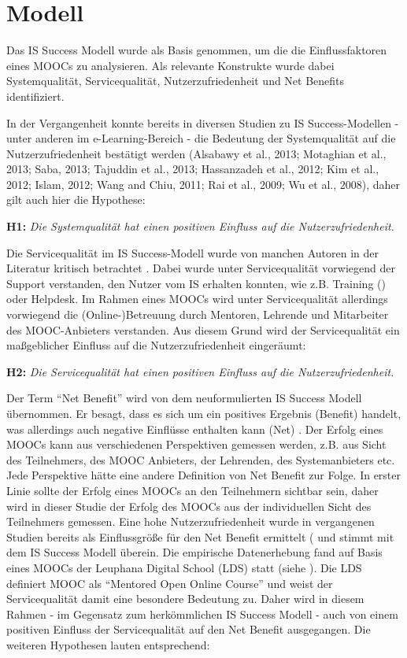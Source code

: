 \section{Modell}
\label{sec:modell}
Das IS Success Modell wurde als Basis genommen, um die die Einflussfaktoren eines MOOCs zu analysieren. Als relevante Konstrukte wurde dabei Systemqualität, Servicequalität, Nutzerzufriedenheit und Net Benefits identifiziert.  

In der Vergangenheit konnte bereits in diversen Studien zu IS Success-Modellen - unter anderen im e-Learning-Bereich - die Bedeutung der Systemqualität auf die Nutzerzufriedenheit bestätigt werden (Alsabawy et al., 2013; Motaghian et al., 2013; Saba, 2013; Tajuddin et al., 2013; Hassanzadeh et al., 2012; Kim et al., 2012; Islam, 2012; Wang and Chiu, 2011; Rai et al., 2009; Wu et al., 2008), daher gilt auch hier die Hypothese: \medskip

\textbf{H1:} \textit{Die Systemqualität hat einen positiven Einfluss auf die Nutzerzufriedenheit.} \medskip

Die Servicequalität im IS Success-Modell wurde von manchen Autoren in der Literatur kritisch betrachtet . Dabei wurde unter Servicequalität vorwiegend der Support verstanden, den Nutzer vom IS erhalten konnten, wie z.B. Training (\parencite{petter2009meta}) oder Helpdesk. Im Rahmen eines MOOCs wird unter Servicequalität allerdings vorwiegend die (Online-)Betreuung durch Mentoren, Lehrende und Mitarbeiter des MOOC-Anbieters verstanden. Aus diesem Grund wird der Servicequalität ein maßgeblicher Einfluss auf die Nutzerzufriedenheit eingeräumt: \medskip

\textbf{H2:} \textit{Die Servicequalität hat einen positiven Einfluss auf die Nutzerzufriedenheit.}\medskip

Der Term "`Net Benefit"' wird von dem neuformulierten IS Success Modell übernommen. Er besagt, dass es sich um ein positives Ergebnis (Benefit) handelt, was allerdings auch negative Einflüsse enthalten kann (Net) \parencite[vgl.][S.2974]{delone2002information}. Der Erfolg eines MOOCs kann aus verschiedenen Perspektiven gemessen werden, z.B. aus Sicht des Teilnehmers, des MOOC Anbieters, der Lehrenden, des Systemanbieters etc. Jede Perspektive hätte eine andere Definition von Net Benefit zur Folge. In erster Linie sollte der Erfolg eines MOOCs an den Teilnehmern sichtbar sein, daher wird in dieser Studie der Erfolg des MOOCs aus der individuellen Sicht des Teilnehmers gemessen. Eine hohe Nutzerzufriedenheit wurde in vergangenen Studien bereits als Einflussgröße für den Net Benefit ermittelt ( und stimmt mit dem IS Success Modell überein. Die empirische Datenerhebung fand auf Basis eines MOOCs der Leuphana Digital School (LDS) statt (siehe ). Die LDS definiert MOOC als "`Mentored Open Online Course"' und weist der Servicequalität damit eine besondere Bedeutung zu. Daher wird in diesem Rahmen - im Gegensatz zum herkömmlichen IS Success Modell - auch von einem positiven Einfluss der Servicequalität auf den Net Benefit ausgegangen. Die weiteren Hypothesen lauten entsprechend: \medskip



